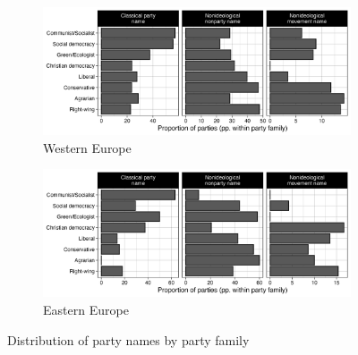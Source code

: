 \documentclass[12pt]{article}
\newcommand{\pathtables}{./tables/}
\begin{document}
\begin{figure}[H]
\centering
\begin{subfigure}[t]{0.9\textwidth}
  \includegraphics[width=\textwidth]{./Figures/Figure4_west.png}
  \caption{Western Europe}
\end{subfigure}
\vspace{0.5em} %
\begin{subfigure}[t]{0.9\textwidth}
  \includegraphics[width=\textwidth]{./Figures/Figure4_east.png}
  \caption{Eastern Europe}
\end{subfigure}
\caption{Distribution of party names by party family}
\end{figure}

\newpage




\clearpage



\clearpage



\newpage
\end{document}
